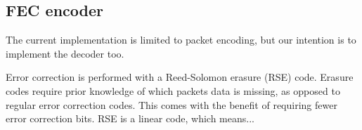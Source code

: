 \subsection{FEC encoder}

The current implementation is limited to packet encoding, but our intention is
to implement the decoder too.

Error correction is performed with a Reed-Solomon erasure (RSE) code.  Erasure codes
require prior knowledge of which packets data is missing, as opposed to regular
error correction codes.  This comes with the benefit of requiring fewer error
correction bits.  RSE is a linear code, which means...

